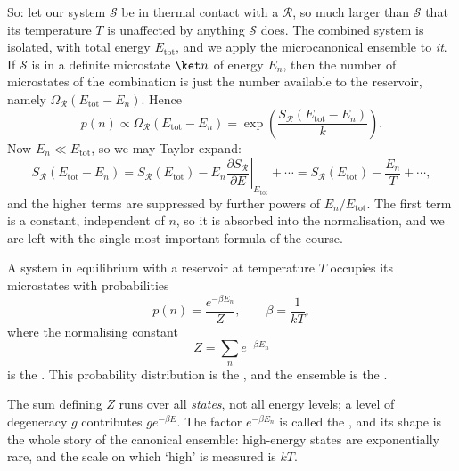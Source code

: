 So: let our system $\mathcal S$ be in thermal contact with a  $\mathcal R$, so much larger than $\mathcal S$ that its temperature $T$ is unaffected by anything $\mathcal S$ does. The combined system is isolated, with total energy $E_{\mathrm{tot}}$, and we apply the microcanonical ensemble to \emph{it}. If $\mathcal S$ is in a definite microstate $\ket n$ of energy $E_n$, then the number of microstates of the combination is just the number available to the reservoir, namely $\Omega_{\mathcal R}(E_{\mathrm{tot}} - E_n)$. Hence
$$
p(n) \propto \Omega_{\mathcal R}(E_{\mathrm{tot}} - E_n) = \exp\left(\frac{S_{\mathcal R}(E_{\mathrm{tot}} - E_n)}{k}\right).
$$
Now $E_n \ll E_{\mathrm{tot}}$, so we may Taylor expand:
$$
S_{\mathcal R}(E_{\mathrm{tot}} - E_n) = S_{\mathcal R}(E_{\mathrm{tot}}) - E_n \left.\frac{\partial S_{\mathcal R}}{\partial E}\right|_{E_{\mathrm{tot}}} + \cdots = S_{\mathcal R}(E_{\mathrm{tot}}) - \frac{E_n}{T} + \cdots,
$$
and the higher terms are suppressed by further powers of $E_n/E_{\mathrm{tot}}$. The first term is a constant, independent of $n$, so it is absorbed into the normalisation, and we are left with the single most important formula of the course.

\begin{definition}
	A system in equilibrium with a reservoir at temperature $T$ occupies its microstates with probabilities
	$$
	p(n) = \frac{e^{-\beta E_n}}{Z}, \qquad \beta = \frac{1}{kT},
	$$
	where the normalising constant
	$$
	Z = \sum_n e^{-\beta E_n}
	$$
	is the . This probability distribution is the , and the ensemble is the .
\end{definition}

The sum defining $Z$ runs over all \emph{states}, not all energy levels; a level of degeneracy $g$ contributes $g e^{-\beta E}$. The factor $e^{-\beta E_n}$ is called the , and its shape is the whole story of the canonical ensemble: high-energy states are exponentially rare, and the scale on which `high' is measured is $kT$.

